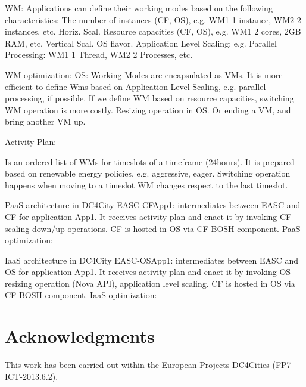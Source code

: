\documentclass[10pt, conference, compsocconf]{IEEEtran}
\begin{document}
WM:
Applications can define their working modes based on the following characteristics:
The number of instances (CF, OS), e.g. WM1 1 instance, WM2 2 instances, etc. Horiz. Scal.
Resource capacities (CF, OS), e.g. WM1 2 cores, 2GB RAM, etc. Vertical Scal. OS flavor.
Application Level Scaling: e.g. Parallel Processing: WM1 1 Thread, WM2 2 Processes, etc.

WM optimization:
OS: Working Modes are encapsulated as VMs.
It is more efficient to define Wms based on Application Level Scaling, e.g. parallel processing, if possible.
If we define WM based on resource capacities,  switching WM operation is more costly.
Resizing operation in OS.
Or ending a VM, and bring another VM up.

Activity Plan:

Is an ordered list of WMs for timeslots of a timeframe (24hours).
It is prepared based on renewable energy policies, e.g. aggressive, eager.
Switching operation happens when moving to a timeslot WM changes respect to the last timeslot.

PaaS architecture in DC4City
EASC-CFApp1: intermediates between EASC and CF for application App1. It receives activity plan and enact it by invoking CF scaling down/up operations.
CF is hosted in OS via CF BOSH component.
PaaS optimization:

IaaS architecture in DC4City
EASC-OSApp1: intermediates between EASC and OS for application App1. It receives activity plan and enact it by invoking OS resizing operation (Nova API), application level scaling.
CF is hosted in OS via CF BOSH component.
IaaS optimization:





\section*{Acknowledgments}

This work has been carried out within the European Projects DC4Cities (FP7-ICT-2013.6.2).



\end{document}
